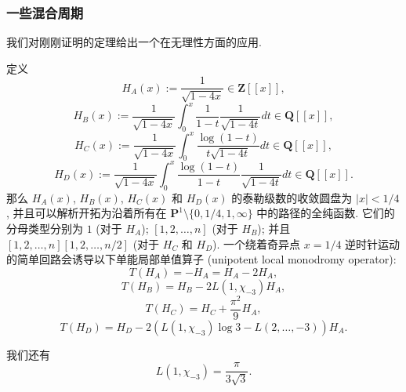 \subsubsection{一些混合周期}\label{sec:2.11.12}

我们对刚刚证明的定理给出一个在无理性方面的应用.

\begin{lemma}\label{lem:2.11.13}
定义
\[ H_A(x) := \frac{1}{\sqrt{1 - 4x}} \in \mathbf{Z}[\! [x]\!], \]
\[ H_B(x) := \frac{1}{\sqrt{1 - 4x}} \int_0^x \frac{1}{1 - t} \frac{1}{\sqrt{1 - 4t}} dt \in \mathbf{Q}[\! [x]\!], \]
\[ H_C(x) := \frac{1}{\sqrt{1 - 4x}} \int_0^x \frac{\log(1 - t)}{t\sqrt{1 - 4t}} dt \in \mathbf{Q}[\! [x]\!], \]
\[ H_D(x) := \frac{1}{\sqrt{1 - 4x}} \int_0^x \frac{\log(1 - t)}{1 - t} \frac{1}{\sqrt{1 - 4t}} dt \in \mathbf{Q}[\! [x]\!]. \]
那么 \(H_A(x)\), \(H_B(x)\), \(H_C(x)\) 和 \(H_D(x)\) 的泰勒级数的收敛圆盘为 \(|x| < 1/4\), 并且可以解析开拓为沿着所有在 \(\mathbf{P}^1 \setminus \{0, 1/4, 1, \infty\}\) 中的路径的全纯函数. 它们的分母类型分别为 \(1\) (对于 \(H_A\)); \([1, 2, \dots, n]\) (对于 \(H_B\)); 并且 \([1, 2, \dots, n][1, 2, \dots, n/2]\) (对于 \(H_C\) 和 \(H_D\)). 一个绕着奇异点 \(x = 1/4\) 逆时针运动的简单回路会诱导以下单能局部单值算子 (unipotent local monodromy operator):
\begin{equation}\label{eq:2.11.14}
  T(H_A) = - H_A = H_A - 2H_A,
\end{equation}
\[ T(H_B) = H_B - 2L(1, \chi_{-3})H_A, \]
\[ T(H_C) = H_C + \frac{\pi^2}{9}H_A, \]
\[ T(H_D) = H_D - 2(L(1, \chi_{-3}) \log 3 - L(2, \dots, -3))H_A. \]
\end{lemma}

我们还有
\begin{equation}\label{eq:2.11.15}
  L(1,\chi_{-3}) = \frac{\pi}{3\sqrt{3}}.
\end{equation}

